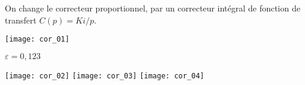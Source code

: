 On change le correcteur proportionnel, par un correcteur intégral de fonction de transfert $C(p)=Ki/p$.
\ifprof
\begin{corrige}
\end{corrige}
\else
\fi



\ifprof


\begin{center}
	\texttt{[image: cor\_01]}
	
	$\varepsilon = 0,123$
	
	\texttt{[image: cor\_02]}
	\texttt{[image: cor\_03]}
	\texttt{[image: cor\_04]}
\end{center}



%
\else
\fi
